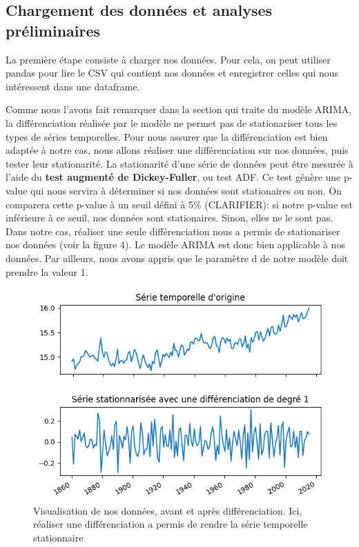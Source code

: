 \documentclass[french]{article}
\begin{document}
    \subsection{Chargement des données et analyses préliminaires}

    La première étape consiste à charger nos données. Pour cela, on peut utiliser pandas pour lire le CSV qui contient nos données et enregistrer celles qui nous intéressent dans une dataframe. 

    Comme nous l'avons fait remarquer dans la section qui traite du modèle ARIMA, la différenciation réalisée par le modèle ne permet pas de stationariser tous les types de séries temporelles. Pour nous assurer que la différenciation est bien adaptée à notre cas, nous allons réaliser une différenciation sur nos données, puis tester leur stationarité.
    La stationarité d'une série de données peut être mesurée à l'aide du \textbf{test augmenté de Dickey-Fuller}, ou test ADF. Ce test génère une p-value qui nous servira à déterminer si nos données sont stationaires ou non. On comparera cette p-value à un seuil défini à 5\% (CLARIFIER): si notre p-value est inférieure à ce seuil, nos données sont stationaires. Sinon, elles ne le sont pas.
    Dans notre cas, réaliser une seule différenciation nous a permis de stationariser nos données (voir la figure 4). Le modèle ARIMA est donc bien applicable à nos données. Par ailleurs, nous avons appris que le paramètre d de notre modèle doit prendre la valeur 1.
    \begin{figure}[h]
        \includegraphics[width=12cm]{differenciating}
        \centering
        \caption{Visualisation de nos données, avant et après différenciation. Ici, réaliser une différenciation a permis de rendre la série temporelle stationnaire}
        \centering
    \end{figure}
\end{document}
